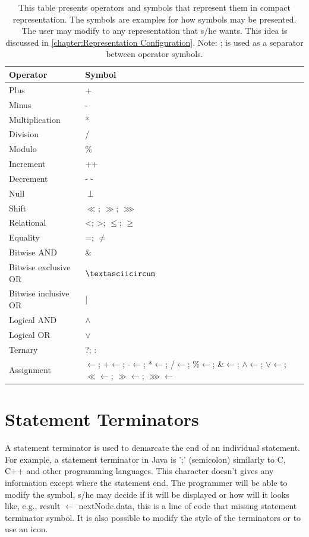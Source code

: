 \begin{table}[H]
\centering
\begin{tabular}{|l|l|}
\hline
{\bf Operator} & {\bf Symbol} \\ \hline
Plus & + \\ \hline
Minus & - \\ \hline
Multiplication & * \\ \hline
Division & / \\ \hline
Modulo & \% \\ \hline
Increment & ++ \\ \hline
Decrement & - - \\ \hline
Null & $ \perp $ \\ \hline
Shift & $ \ll $; $ \gg $; $ \ggg $ \\ \hline
Relational & <; >; $ \leq $; $ \geq $ \\ \hline
Equality & =; $ \neq $ \\ \hline
Bitwise AND & \& \\ \hline
Bitwise exclusive OR & $ \textasciicircum $ \\ \hline
Bitwise inclusive OR & | \\ \hline
Logical AND & $ \wedge $  \\ \hline
Logical OR & $ \vee $  \\ \hline
Ternary & ?; : \\ \hline
Assignment & $ \longleftarrow $; +$ \longleftarrow $; -$ \longleftarrow $; *$ \longleftarrow $; /$ \longleftarrow $; \%$ \longleftarrow $; \&$ \longleftarrow $; $ \wedge $$ \longleftarrow $; $ \vee $$ \longleftarrow $; $ \ll $$ \longleftarrow $; $ \gg $$ \longleftarrow $; $ \ggg $$ \longleftarrow $\\ \hline
\end{tabular}
\caption{This table presents operators and symbols that represent them in compact representation. The symbols are examples for how symbols may be presented. The user may modify to any representation that s/he wants. This idea is discussed in \autoref{chapter:Representation Configuration}. Note: ; is used as a separator between operator symbols.}
\label{tab12}
\end{table}
\section{Statement Terminators}
A statement terminator is used to demarcate the end of an individual statement. For example, a statement terminator in Java is ';' (semicolon) similarly to C, C++ and other programming languages. This character doesn't gives any information except where the statement end. The programmer will be able to modify the symbol, s/he may decide if it will be displayed or how will it looks like, e.g., result $ \longleftarrow $ nextNode.data, this is a line of code that missing statement terminator symbol. It is also possible to modify the style of the terminators or to use an icon.
